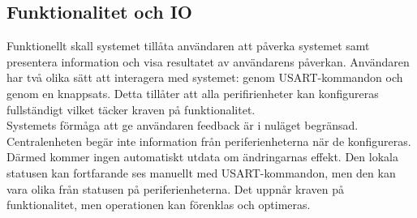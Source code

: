\subsection{Funktionalitet och IO} %
\label{sec:funktionalitet}





Funktionellt skall systemet tillåta användaren att påverka systemet samt presentera information och visa resultatet av användarens påverkan. Användaren har två olika sätt att interagera med systemet: genom USART-kommandon och genom en knappsats. Detta tillåter att alla perifirienheter kan konfigureras fullständigt vilket täcker kraven på funktionalitet. \\

Systemets förmåga att ge användaren feedback är i nuläget begränsad. Centralenheten begär inte information från periferienheterna när de konfigureras. Därmed kommer ingen automatiskt utdata om ändringarnas effekt. Den lokala statusen kan fortfarande ses manuellt med USART-kommandon, men den kan vara olika från statusen på periferienheterna. Det uppnår kraven på funktionalitet, men operationen kan förenklas och optimeras. \\ 


